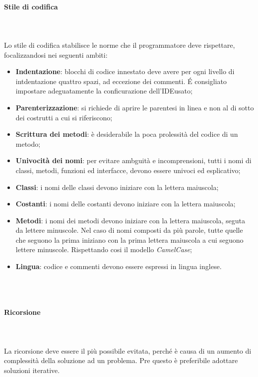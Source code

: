 		\paragraph{Stile di codifica} \mbox{} \\ \mbox{} \\
		Lo stile di codifica stabilisce le norme che il programmatore deve rispettare, focalizzandosi nei seguenti ambiti:
		\begin{itemize}
			\item \textbf{Indentazione}: blocchi di codice innestato deve avere per ogni livello di intdentazione quattro spazi, ad eccezione dei commenti. \'E consigliato impostare adeguatamente la conficurazione dell'IDE\glo usato;
			\item \textbf{Parenterizzazione}: si richiede di aprire le parentesi in linea e non al di sotto dei costrutti a cui si riferiscono;
			\item \textbf{Scrittura dei metodi}: è desiderabile la poca prolessità del codice di un metodo;
			\item \textbf{Univocità dei nomi}: per evitare ambguità e incomprensioni, tutti i nomi di classi, metodi, funzioni ed interfacce, devono essere univoci ed esplicativo;
			\item \textbf{Classi}: i nomi delle classi devono iniziare con la lettera maiuscola;
			\item \textbf{Costanti}: i nomi delle costanti devono iniziare con la lettera maiuscola;
			\item \textbf{Metodi}: i nomi dei metodi devono iniziare con la lettera maiuscola, seguta da lettere minuscole. Nel caso di nomi composti da più parole, tutte quelle che seguono la prima iniziano con la prima lettera maiuscola a cui seguono lettere minuscole. Rispettando cosi il modello \textit{CamelCase}\glo;
			\item \textbf{Lingua}: codice e commenti devono essere espressi in lingua inglese.
		\end{itemize}
		\\
		\\
		\paragraph{Ricorsione} \mbox{} \\ \mbox{} \\
		La ricorsione deve essere il più possibile evitata, perché è causa di un aumento di complessità della soluzione ad un problema. Pre questo è preferibile adottare soluzioni iterative.

